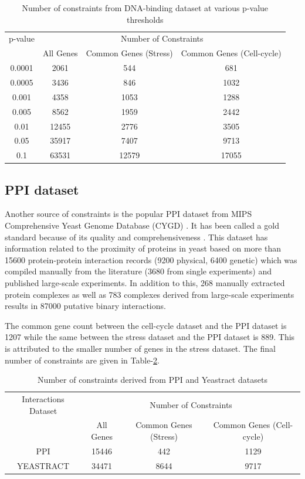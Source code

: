 \begin{table}
\centering
\begin{tabular}{|c|c|c|c|}
\hline
p-value & \multicolumn{3}{|c|}{Number of Constraints} \\ \cline{2-4}
& All Genes & Common Genes (Stress) & Common Genes (Cell-cycle)\\
\hline
0.0001 & 2061  & 544   & 681\\
0.0005 & 3436  & 846   & 1032\\
0.001  & 4358  & 1053  & 1288\\
0.005  & 8562  & 1959  & 2442\\
0.01   & 12455 & 2776  & 3505\\
0.05   & 35917 & 7407  & 9713\\
0.1    & 63531 & 12579 & 17055\\
\hline 
\end{tabular}
\caption{Number of constraints from DNA-binding dataset at various p-value thresholds}
\label{tab:no_constraints}
\end{table}

\subsection{PPI dataset}
Another source of constraints is the popular PPI dataset from MIPS Comprehensive Yeast Genome Database (CYGD) \citep{Gueldener2006MPact}. It has been called a gold standard because of its quality and comprehensiveness \citep{yu2004annotation}. This dataset has information related to the proximity of proteins in yeast based on more than 15600 protein-protein interaction records (9200 physical, 6400 genetic) which was compiled manually from the literature (3680 from single experiments) and published large-scale experiments. In addition to this, 268 manually extracted protein complexes as well as 783 complexes derived from large-scale experiments results in 87000 putative binary interactions. 

The common gene count between the cell-cycle dataset and the PPI dataset is 1207 while the same between the stress dataset and the PPI dataset is 889. This is attributed to the smaller number of genes in the stress dataset. The final number of constraints are given in Table-\ref{tab:ppi_yeastract:no_constraints}.

\begin{table}
\centering
\begin{tabular}{|c|c|c|c|}
\hline
Interactions Dataset & \multicolumn{3}{|c|}{Number of Constraints} \\ \cline{2-4}
& All Genes & Common Genes (Stress) & Common Genes (Cell-cycle)\\
\hline
PPI          & 15446 & 442  & 1129 \\
YEASTRACT    & 34471 & 8644 & 9717 \\
\hline 
\end{tabular}
\caption{Number of constraints derived from PPI and Yeastract datasets}
\label{tab:ppi_yeastract:no_constraints}
\end{table}

